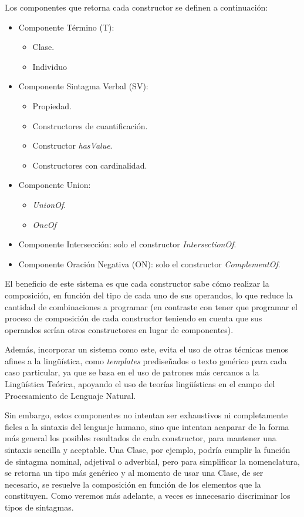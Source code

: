 Los componentes que retorna cada constructor se definen a continuación:
\begin{itemize}
    \item Componente Término (T):
    \begin{itemize}
        \item Clase.
        \item Individuo
    \end{itemize}
    \item Componente Sintagma Verbal (SV):
    \begin{itemize}
        \item Propiedad.
        \item Constructores de cuantificación.
        \item Constructor \emph{hasValue}.
        \item Constructores con cardinalidad.
    \end{itemize}
    \item Componente Union: 
    \begin{itemize}
        \item \emph{UnionOf}.
        \item \emph{OneOf}
    \end{itemize}
    
    \item Componente Intersección: solo el constructor \emph{IntersectionOf}.
    \item Componente Oración Negativa (ON): solo el constructor \emph{ComplementOf}.
\end{itemize}

El beneficio de este sistema es que cada constructor sabe cómo realizar la composición, en función del tipo de cada uno de sus operandos, lo que reduce la cantidad de combinaciones a programar (en contraste con tener que programar el proceso de composición de cada constructor teniendo en cuenta que sus operandos serían otros constructores en lugar de componentes). 

Además, incorporar un sistema como este, evita el uso de otras técnicas menos afines a la lingüística, como \emph{templates} prediseñados o texto genérico para cada caso particular, ya que se basa en el uso de patrones más cercanos a la Lingüística Teórica, apoyando el uso de teorías lingüísticas en el campo del Procesamiento de Lenguaje Natural.


Sin embargo, estos componentes no intentan ser exhaustivos ni completamente fieles a la sintaxis del lenguaje humano, sino que intentan acaparar de la forma más general los posibles resultados de cada constructor, para mantener una sintaxis sencilla y aceptable. Una Clase, por ejemplo, podría cumplir la función de sintagma nominal, adjetival o adverbial, pero para simplificar la nomenclatura, se retorna un tipo más genérico y al momento de usar una Clase, de ser necesario, se resuelve la composición en función de los elementos que la constituyen. Como veremos más adelante, a veces es innecesario discriminar los tipos de sintagmas.


